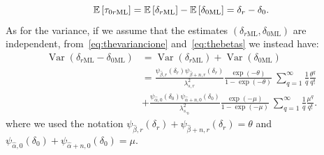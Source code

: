 \begin{equation}
\mathbb{E}\left[{\tau_{0r\mathrm{ML}}}\right]=\mathbb{E}\left[{\delta_{r\mathrm{ML}}}\right]-\mathbb{E}\left[{\delta_{0\mathrm{ML}}}\right]
=\delta_{r}-\delta_{0}.
\end{equation}
As for the variance, if we assume that the estimates \((\delta_{r\mathrm{ML}},\delta_{0\mathrm{ML}})\) are independent, from~\eqref{eq:thevariancione} and~\eqref{eq:thebetas} we instead have:
\begin{equation}
\begin{aligned}
\operatorname{Var}(\delta_{r\mathrm{ML}}-\delta_{0\mathrm{ML}})
& = \operatorname{Var}(\delta_{r\mathrm{ML}})+\operatorname{Var}(\delta_{0\mathrm{ML}})\\
& = \frac{\psi_{\hat{\beta},r}(\delta_r) \psi_{\hat{\beta}+n,r}(\delta_r)}{\lambda_{s,r}^2}
\frac{\exp\left(-\theta\right)}{1-\exp(-\theta)}\
\sum_{q=1}^{\infty} \frac{1}{q}\frac{\theta^q}{q!}\\
&+\frac{\psi_{\hat{\alpha},0}(\delta_0) \psi_{\hat{\alpha}+n,0}(\delta_0)}{\lambda_{s,_0}^2}
\frac{\exp\left(-\mu\right)}{1-\exp(-\mu)}\
\sum_{q=1}^{\infty} \frac{1}{q}\frac{\mu^q}{q!}.
\end{aligned}
\end{equation}
where we used the notation \(\psi_{\hat{\beta},r}(\delta_r) +\psi_{\hat{\beta}+n,r}(\delta_r)=\theta\) and \(\psi_{\hat{\alpha},0}(\delta_0) +\psi_{\hat{\alpha}+n,0}(\delta_0)=\mu\).
